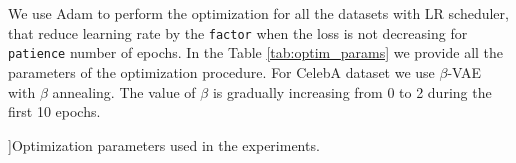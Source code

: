 We use Adam to perform the optimization for all the datasets with LR scheduler, that reduce learning rate by the \texttt{factor} when the loss is not decreasing for \texttt{patience} number of epochs. In the Table \ref{tab:optim_params} we provide all the parameters of the optimization procedure. For CelebA dataset we use $\beta$-VAE with $\beta$ annealing. The value of $\beta$ is gradually increasing from 0 to 2 during the first 10 epochs. 
\begin{table}[ht]
\begin{center}
\caption[][\baselineskip]{Optimization parameters used in the experiments.}
\label{tab:optim_params}
\vspace{20pt}
\end{center}
\end{table}

